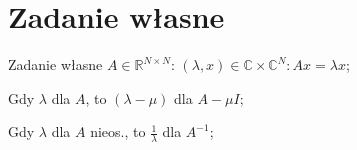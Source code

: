\section{Zadanie własne}



\entry
Zadanie własne $A \in \mathbb{R}^{N \times N}$:
$(\lambda,x) \in \mathbb{C} \times \mathbb{C}^N: Ax = \lambda x$;

\entry
Gdy $\lambda$ dla $A$, to $(\lambda - \mu)$ dla $A-\mu I$;

\entry
Gdy $\lambda$ dla $A$ nieos., to $\frac{1}{\lambda}$ dla $A^{-1}$;







